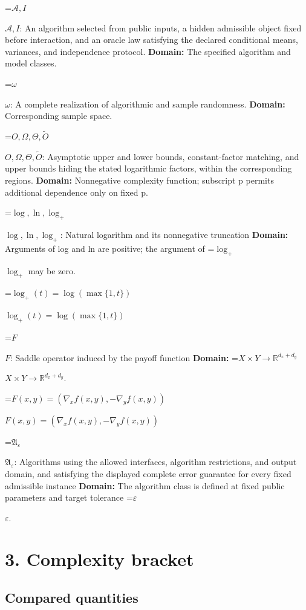 \documentclass[10pt,a4paper]{article}
\newcommand{\AtlasMath}[1]{\par\begingroup\centering\setbox0=\hbox{$\displaystyle #1$}\ifdim\wd0>1.4\linewidth\typeout{ATLAS WIDE FORMULA: \the\wd0}\fi\ifdim\wd0>\linewidth\resizebox{\linewidth}{!}{\box0}\else\box0\fi\par\endgroup}
\newcommand{\AtlasInlineMath}[1]{\begingroup\setbox0=\hbox{$#1$}\ifdim\wd0>.4\linewidth\endgroup\AtlasMath{#1}\else\endgroup$#1$\fi}
\begin{document}
\AtlasInlineMath{\mathcal A,I}: An algorithm selected from public inputs, a hidden admissible object fixed before interaction, and an oracle law satisfying the declared conditional means, variances, and independence protocol. \textbf{Domain:} The specified algorithm and model classes.



\AtlasInlineMath{\omega}: A complete realization of algorithmic and sample randomness. \textbf{Domain:} Corresponding sample space.



\AtlasInlineMath{O,\Omega,\Theta,\widetilde O}: Asymptotic upper and lower bounds, constant-factor matching, and upper bounds hiding the stated logarithmic factors, within the corresponding regions. \textbf{Domain:} Nonnegative complexity function; subscript p permits additional dependence only on fixed p.



\AtlasInlineMath{\log,\ln,\log_+}: Natural logarithm and its nonnegative truncation \textbf{Domain:} Arguments of log and ln are positive; the argument of \AtlasInlineMath{\log_+} may be zero.



\AtlasInlineMath{\log_+(t)=\log(\max\{1,t\})}



\AtlasInlineMath{F}: Saddle operator induced by the payoff function \textbf{Domain:} \AtlasInlineMath{X\times Y\to\mathbb R^{d_x+d_y}}.



\AtlasInlineMath{F(x,y)=(\nabla_xf(x,y),-\nabla_yf(x,y))}



\AtlasInlineMath{\mathfrak A_\varepsilon}: Algorithms using the allowed interfaces, algorithm restrictions, and output domain, and satisfying the displayed complete error guarantee for every fixed admissible instance \textbf{Domain:} The algorithm class is defined at fixed public parameters and target tolerance \AtlasInlineMath{\varepsilon}.



\section{3. Complexity bracket}


\subsection{Compared quantities}
\end{document}
